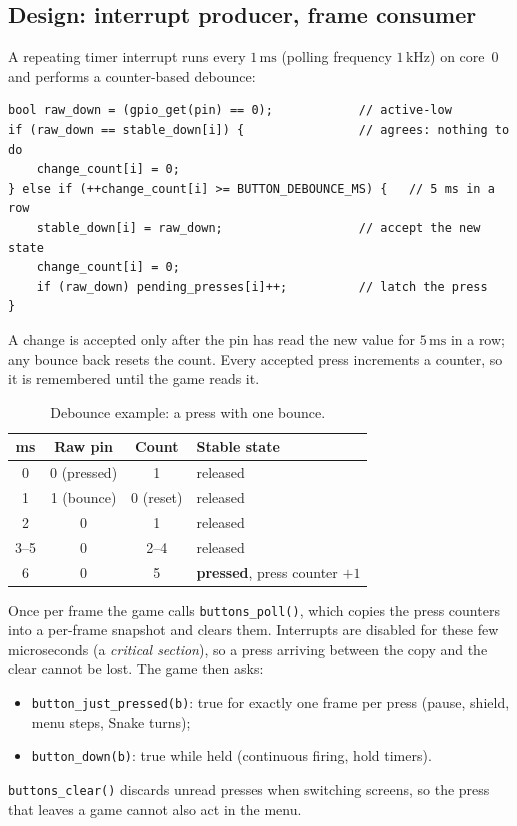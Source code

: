 \documentclass[11pt,a4paper]{article}
\newcommand{\unit}[2]{\ensuremath{#1\,\mathrm{#2}}}
\begin{document}
\subsection{Design: interrupt producer, frame consumer}
A repeating timer interrupt runs every \unit{1}{ms} (polling frequency
\unit{1}{kHz}) on core~0 and performs a counter-based debounce:

\begin{lstlisting}
bool raw_down = (gpio_get(pin) == 0);            // active-low
if (raw_down == stable_down[i]) {                // agrees: nothing to do
    change_count[i] = 0;
} else if (++change_count[i] >= BUTTON_DEBOUNCE_MS) {   // 5 ms in a row
    stable_down[i] = raw_down;                   // accept the new state
    change_count[i] = 0;
    if (raw_down) pending_presses[i]++;          // latch the press
}
\end{lstlisting}

\noindent A change is accepted only after the pin has read the new value for
\unit{5}{ms} in a row; any bounce back resets the count. Every accepted press
increments a counter, so it is remembered until the game reads it.

\begin{table}[H]
\centering
\caption{Debounce example: a press with one bounce.}
\begin{tabular}{cccl}
\toprule
\textbf{ms} & \textbf{Raw pin} & \textbf{Count} & \textbf{Stable state} \\
\midrule
0 & 0 (pressed) & 1 & released \\
1 & 1 (bounce) & 0 (reset) & released \\
2 & 0 & 1 & released \\
3--5 & 0 & 2--4 & released \\
6 & 0 & 5 & \textbf{pressed}, press counter $+1$ \\
\bottomrule
\end{tabular}
\end{table}

Once per frame the game calls \texttt{buttons\_poll()}, which copies the press
counters into a per-frame snapshot and clears them. Interrupts are disabled for
these few microseconds (a \emph{critical section}), so a press arriving between
the copy and the clear cannot be lost. The game then asks:
\begin{itemize}
  \item \texttt{button\_just\_pressed(b)}: true for exactly one frame per press
        (pause, shield, menu steps, Snake turns);
  \item \texttt{button\_down(b)}: true while held (continuous firing, hold timers).
\end{itemize}
\texttt{buttons\_clear()} discards unread presses when switching screens, so the
press that leaves a game cannot also act in the menu.
\end{document}
